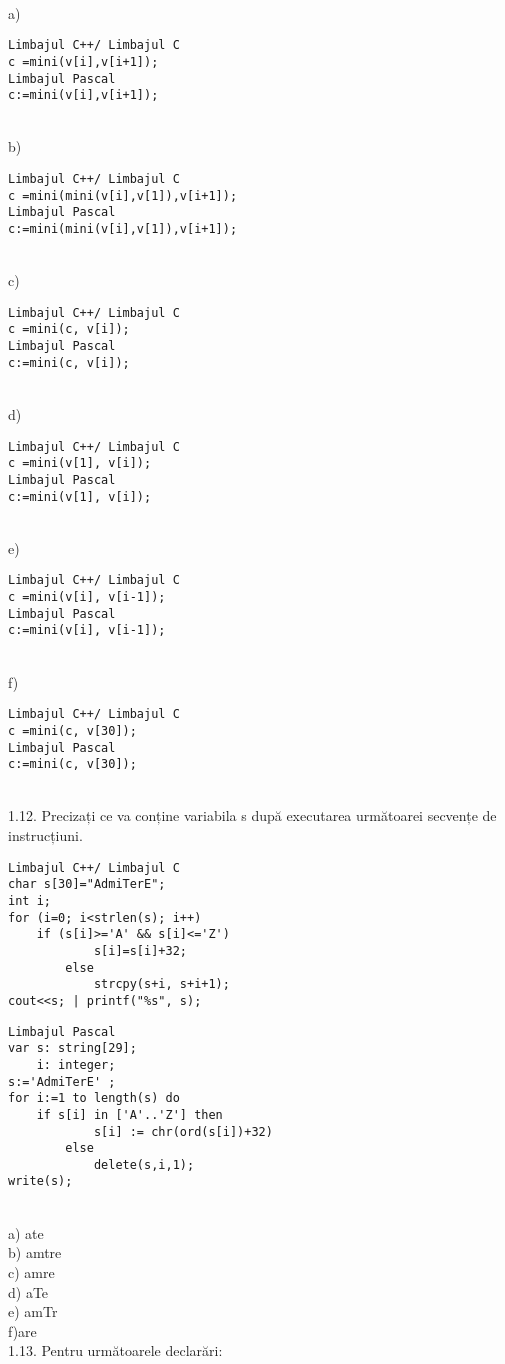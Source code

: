 \\
a) \begin{verbatim}
Limbajul C++/ Limbajul C
c =mini(v[i],v[i+1]);
Limbajul Pascal
c:=mini(v[i],v[i+1]);
\end{verbatim}
\\
b) \begin{verbatim}
Limbajul C++/ Limbajul C
c =mini(mini(v[i],v[1]),v[i+1]);
Limbajul Pascal
c:=mini(mini(v[i],v[1]),v[i+1]);
\end{verbatim}
\\
c) \begin{verbatim}
Limbajul C++/ Limbajul C
c =mini(c, v[i]);
Limbajul Pascal
c:=mini(c, v[i]);
\end{verbatim}
\\
d) \begin{verbatim}
Limbajul C++/ Limbajul C
c =mini(v[1], v[i]);
Limbajul Pascal
c:=mini(v[1], v[i]);
\end{verbatim}
\\
e) \begin{verbatim}
Limbajul C++/ Limbajul C
c =mini(v[i], v[i-1]);
Limbajul Pascal
c:=mini(v[i], v[i-1]);
\end{verbatim}
\\
f) \begin{verbatim}
Limbajul C++/ Limbajul C
c =mini(c, v[30]);
Limbajul Pascal
c:=mini(c, v[30]);
\end{verbatim}
\\
1.12. Precizați ce va conține variabila s după executarea următoarei secvențe de instrucțiuni.
\begin{verbatim}
Limbajul C++/ Limbajul C
char s[30]="AdmiTerE";
int i;
for (i=0; i<strlen(s); i++)
    if (s[i]>='A' && s[i]<='Z')
            s[i]=s[i]+32;
        else
            strcpy(s+i, s+i+1);
cout<<s; | printf("%s", s);
\end{verbatim}
\begin{verbatim}
Limbajul Pascal
var s: string[29];
    i: integer;
s:='AdmiTerE' ;
for i:=1 to length(s) do
    if s[i] in ['A'..'Z'] then
            s[i] := chr(ord(s[i])+32)
        else
            delete(s,i,1);
write(s);
\end{verbatim}
\\
a) ate
\\
b) amtre
\\
c) amre
\\
d) aTe
\\
e) amTr
\\
f)are
\\
1.13. Pentru următoarele declarări:

